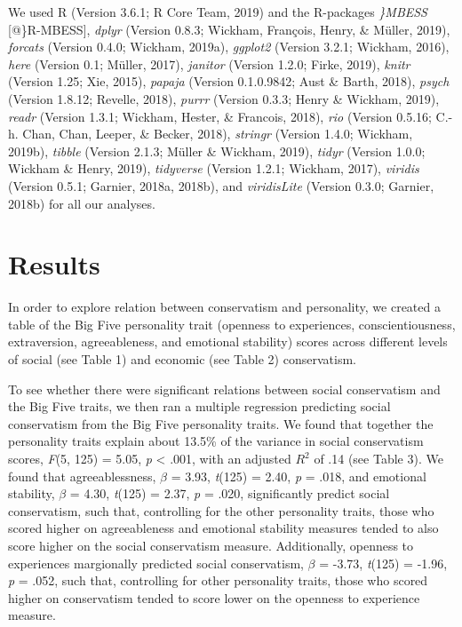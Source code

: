 \documentclass[man]{apa6}
\begin{document}
We used R (Version 3.6.1; R Core Team, 2019) and the R-packages
\emph{\}MBESS} {[}@\}R-MBESS{]}, \emph{dplyr} (Version 0.8.3; Wickham,
François, Henry, \& Müller, 2019), \emph{forcats} (Version 0.4.0;
Wickham, 2019a), \emph{ggplot2} (Version 3.2.1; Wickham, 2016),
\emph{here} (Version 0.1; Müller, 2017), \emph{janitor} (Version 1.2.0;
Firke, 2019), \emph{knitr} (Version 1.25; Xie, 2015), \emph{papaja}
(Version 0.1.0.9842; Aust \& Barth, 2018), \emph{psych} (Version 1.8.12;
Revelle, 2018), \emph{purrr} (Version 0.3.3; Henry \& Wickham, 2019),
\emph{readr} (Version 1.3.1; Wickham, Hester, \& Francois, 2018),
\emph{rio} (Version 0.5.16; C.-h. Chan, Chan, Leeper, \& Becker, 2018),
\emph{stringr} (Version 1.4.0; Wickham, 2019b), \emph{tibble} (Version
2.1.3; Müller \& Wickham, 2019), \emph{tidyr} (Version 1.0.0; Wickham \&
Henry, 2019), \emph{tidyverse} (Version 1.2.1; Wickham, 2017),
\emph{viridis} (Version 0.5.1; Garnier, 2018a, 2018b), and
\emph{viridisLite} (Version 0.3.0; Garnier, 2018b) for all our analyses.

\section{Results}\label{results}

In order to explore relation between conservatism and personality, we
created a table of the Big Five personality trait (openness to
experiences, conscientiousness, extraversion, agreeableness, and
emotional stability) scores across different levels of social (see Table
1) and economic (see Table 2) conservatism.

To see whether there were significant relations between social
conservatism and the Big Five traits, we then ran a multiple regression
predicting social conservatism from the Big Five personality traits. We
found that together the personality traits explain about 13.5\% of the
variance in social conservatism scores, \emph{F}(5, 125) = 5.05,
\emph{p} \textless{} .001, with an adjusted \(R^2\) of .14 (see Table
3). We found that agreeablessness, \(\beta\) = 3.93, \emph{t}(125) =
2.40, \emph{p} = .018, and emotional stability, \(\beta\) = 4.30,
\emph{t}(125) = 2.37, \emph{p} = .020, significantly predict social
conservatism, such that, controlling for the other personality traits,
those who scored higher on agreeableness and emotional stability
measures tended to also score higher on the social conservatism measure.
Additionally, openness to experiences margionally predicted social
conservatism, \(\beta\) = -3.73, \emph{t}(125) = -1.96, \emph{p} = .052,
such that, controlling for other personality traits, those who scored
higher on conservatism tended to score lower on the openness to
experience measure.
\end{document}

